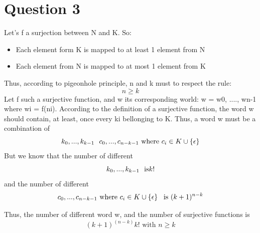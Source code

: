 \documentclass[a4paper,10pt]{article}
\begin{document}
\section{Question 3}
    Let's f a surjection between N and K.  So:
    \begin{itemize}
     \item Each element form K is mapped to at least 1 element from N
     \item Each element from N is mapped to at most 1 element from K
    \end{itemize}
    Thus, according to pigeonhole principle, n and k must to respect the rule:
    \begin{equation}
	n \geq k
    \end{equation}
    Let f such a surjective function, and w its corresponding world:\newline
    w = w0, ...., wn-1 where wi = f(ni).\newline
    According to the definition of a surjective function, the word w should contain, at least, once every ki bellonging to K.
    Thus, a word w must be a combination of
    \begin{equation}
	k_{0}, ..., k_{k-1} \mbox{ \space  } c_{0}, ..., c_{n-k-1} \mbox{\space where } c_{i} \in K \cup \left \{ \epsilon \right \}
    \end{equation}
    But we know that the number of different
    \begin{equation}
	k_{0}, ..., k_{k-1} \mbox{ \space  is} k!
    \end{equation}
    and the number of different
    \begin{equation}
	c_{0}, ..., c_{n-k-1} \mbox{\space where } c_{i} \in K \cup \left \{ \epsilon \right \} \mbox{ \space is } (k+1)^{n-k}
    \end{equation}

    Thus, the number of different word w, and the number of surjective functions is
    \begin{equation}
	(k+1)^{(n-k)} k! \mbox{  with } n \geq k
    \end{equation}
\end{document}
